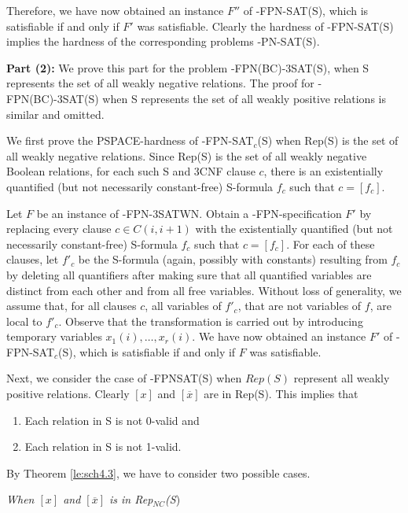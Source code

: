 Therefore, we have now obtained an instance $F''$ 
of {-FPN-SAT(S)}, which is satisfiable
if and only if $F'$ was satisfiable. Clearly the hardness of
{-FPN-SAT(S)} implies the hardness of the corresponding problems 
{-PN-SAT(S)}.


\noindent
{\bf Part (2): }
We prove  this part for the problem {-FPN(BC)-3SAT(S)}, when 
{\sf S} represents the set of all weakly negative relations.
The proof for {-FPN(BC)-3SAT(S)} when {\sf S} represents 
the set of all weakly positive relations is similar and omitted.

We first prove the {\sf PSPACE}-hardness of {-FPN-SAT$_c$(S)}
when {\sf Rep(S)} is the set of all weakly negative relations.
Since {\sf Rep(S)} is the set of all weakly negative  Boolean relations,
for each such {\sf S} and {\sf 3CNF} clause $c$,
there is an existentially quantified (but not necessarily constant-free)
{\sf S}-formula $f_c$ such that $c=[f_c]$. 

Let $F$ be an instance of {-FPN-3SATWN}. 
Obtain a {-FPN}-specification $F'$ 
by replacing every clause $c \in C(i, i+1)$ with the 
existentially quantified (but not necessarily constant-free)
{\sf S}-formula $f_c$ such that $c=[f_c]$. For each of these clauses,
let $f'_c$ be the {\sf S}-formula (again, possibly with
constants) resulting from $f_{c}$ by deleting
all quantifiers after making sure that all quantified variables are
distinct from each other and from all free variables.  Without loss of
generality, we assume that, for all clauses $c$,
all variables of $f'_c$, that are not variables
of $f$, are local to $f'_c$.
Observe that the transformation is carried out by introducing temporary
variables $x_1(i), \ldots, x_r(i)$.
We have now obtained an instance $F'$ of {-FPN-SAT$_c$(S)}, 
which is satisfiable if and only if $F$ was satisfiable. 

Next, we consider the case  of {-FPNSAT(S)} when $Rep(S)$ 
represent all weakly positive relations. 
Clearly $[x]$ and $[\overline{x}]$  are in {\sf Rep(S)}.
This implies that 
\begin{enumerate}
\item
Each relation in {\sf S} is not 0-valid and

\item
Each relation in {\sf S} is not 1-valid.
\end{enumerate}
By Theorem \ref{le:sch4.3}, we have to consider two possible cases.

\noindent
{\em When $[x]$ and $[\overline{x}]$ is in {\sf Rep}$_{NC}$({\sf S}})

